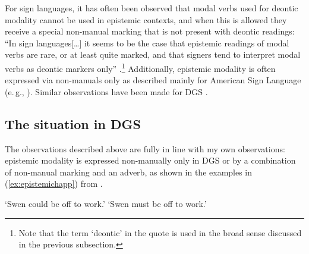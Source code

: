 For sign languages, it has often been observed that modal verbs used for deontic modality cannot be used in epistemic contexts, and when this is allowed they receive a special non-manual marking that is not present with deontic readings: ``In sign languages[\dots ] it seems to be the case that epistemic readings of modal verbs are rare, or at least quite marked, and that signers tend to interpret modal verbs as deontic markers only'' \citep[231]{signgram2017}.\footnote{ Note that the term `deontic' in the quote is used in the broad sense discussed in the previous subsection.} Additionally, epistemic modality is often expressed via non-manuals only as described mainly for American Sign Language (e.\,g., \citealt{wilcox1995gestural, wilcox1996deontic, shaffer2000syntactic, wilcox2006modality}). Similar observations have been made for DGS \citep{herrmann2013modal, happ2014vork, bross2017scope}.

\subsection{The situation in DGS}
The observations described above are fully in line with my own observations: epistemic modality is expressed non-manually only in DGS or by a combination of non-manual marking and an adverb, as shown in the examples in (\ref{ex:epistemichapp}) from \citet[364]{happ2014vork}.


\begin{exe}
\ex\label{ex:epistemichapp}\begin{xlist}
\ex {}
\glt `Swen could be off to work.'\label{epistemichappa}
\ex {}
\glt `Swen must be off to work.'\label{epistemichappb}
\end{xlist}
\end{exe}

